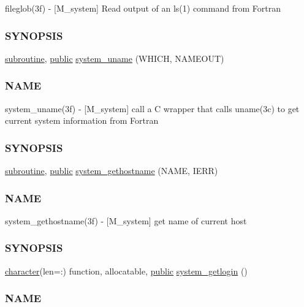 \begin{DoxyCompactItemize}
\begin{DoxyCompactList}
fileglob(3f) -\/ \mbox{[}M\+\_\+system\mbox{]} Read output of an ls(1) command from Fortran \subsubsection*{S\+Y\+N\+O\+P\+S\+IS}\end{DoxyCompactList}\item 
\hyperlink{M__stopwatch_83_8txt_acfbcff50169d691ff02d4a123ed70482}{subroutine}, \hyperlink{M__stopwatch_83_8txt_a2f74811300c361e53b430611a7d1769f}{public} \hyperlink{namespacem__system_a04e5d49509c44bcb2ccabfd80ec8cdfb}{system\+\_\+uname} (W\+H\+I\+CH, N\+A\+M\+E\+O\+UT)
\begin{DoxyCompactList}\small\item\em \subsubsection*{N\+A\+ME}

system\+\_\+uname(3f) -\/ \mbox{[}M\+\_\+system\mbox{]} call a C wrapper that calls uname(3c) to get current system information from Fortran \subsubsection*{S\+Y\+N\+O\+P\+S\+IS}\end{DoxyCompactList}\item 
\hyperlink{M__stopwatch_83_8txt_acfbcff50169d691ff02d4a123ed70482}{subroutine}, \hyperlink{M__stopwatch_83_8txt_a2f74811300c361e53b430611a7d1769f}{public} \hyperlink{namespacem__system_a96fab225737afb77ff1cbba9866f0d05}{system\+\_\+gethostname} (N\+A\+ME, I\+E\+RR)
\begin{DoxyCompactList}\small\item\em \subsubsection*{N\+A\+ME}

system\+\_\+gethostname(3f) -\/ \mbox{[}M\+\_\+system\mbox{]} get name of current host \subsubsection*{S\+Y\+N\+O\+P\+S\+IS}\end{DoxyCompactList}\item 
\hyperlink{option__stopwatch_83_8txt_abd4b21fbbd175834027b5224bfe97e66}{character}(len=\+:) function, allocatable, \hyperlink{M__stopwatch_83_8txt_a2f74811300c361e53b430611a7d1769f}{public} \hyperlink{namespacem__system_a70f78645a1f130734005e190d469529d}{system\+\_\+getlogin} ()
\begin{DoxyCompactList}\small\item\em \subsubsection*{N\+A\+ME}


\end{DoxyCompactList}
\end{DoxyCompactItemize}
